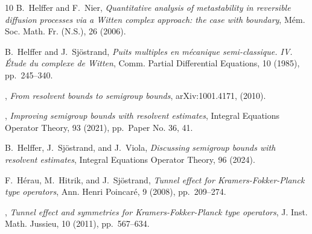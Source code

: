 \documentclass[12pt]{amsart}
\numberwithin{equation}{section}
\numberwithin{figure}{section}
\begin{document}
\begin{thebibliography}{10}
{\sc B.~Helffer and F.~Nier}, {\em Quantitative analysis of metastability in reversible diffusion processes via a {W}itten complex approach: the case with boundary}, M\'em. Soc. Math. Fr. (N.S.), 26 (2006).

{\sc B.~Helffer and J.~Sj\"ostrand}, {\em Puits multiples en m\'ecanique semi-classique. {IV}. \'{E}tude du complexe de {W}itten}, Comm. Partial Differential Equations, 10 %
(1985), pp.~245--340.

\bysame, {\em From resolvent %
bounds to semigroup %
bounds}, arXiv:1001.4171,  (2010).

\bysame, {\em Improving semigroup %
bounds with resolvent estimates}, Integral Equations Operator %
Theory, 93 (2021), %
pp.~Paper No. 36, 41.

{\sc B.~Helffer, J.~Sj\"ostrand, and J.~Viola}, {\em Discussing semigroup bounds with resolvent estimates}, Integral Equations %
Operator Theory, 96 (2024). %

{\sc F.~H\'erau, M.~Hitrik, and J.~Sj\"ostrand}, {\em Tunnel effect for {K}ramers-{F}okker-{P}lanck type operators}, Ann. Henri %
Poincar\'e, 9 (2008), pp.~209--274. %

\bysame, {\em Tunnel effect and symmetries for {K}ramers-{F}okker-{P}lanck type operators}, J. Inst. Math. %
Jussieu, 10 (2011), pp.~567--634. %


\end{thebibliography}
\end{document}
